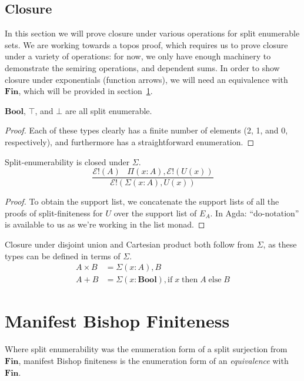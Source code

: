 \subsection{Closure}
In this section we will prove closure under various operations for split
enumerable sets.
We are working towards a topos proof, which requires us to prove closure under
a variety of operations: for now, we only have enough machinery to demonstrate
the semiring operations, and dependent sums.
In order to show closure under exponentials (function arrows), we will need an
equivalence with \(\mathbf{Fin}\), which will be provided in
section~\ref{manifest-bishop}.
\begin{rm-lemma} \label{split-enum-bool-top-bot}
  \(\mathbf{Bool}\), \(\top\), and \(\bot\) are all split enumerable.
\end{rm-lemma}
\begin{proof}
  Each of these types clearly has a finite number of elements (2, 1, and 0,
  respectively), and furthermore has a straightforward enumeration.
\end{proof}
\begin{rm-theorem} \label{split-enum-sigma}
  Split-enumerability is closed under \(\Sigma\).
  \begin{equation} \label{split-enum-sigma-clos-sig}
    \frac{
      \mathcal{E}!(A) \; \; \; \Pi (x : A) , \mathcal{E}!(U(x))
    }{
      \mathcal{E}!(\Sigma (x : A) , U(x))
    }
  \end{equation}
\end{rm-theorem}
\begin{proof}
  To obtain the support list, we concatenate the support lists of all the proofs
  of split-finiteness for \(U\) over the support list of \(E_A\).
  In Agda:
  ``do-notation'' is available to us as we're working in the list monad.
\end{proof}
Closure under disjoint union and Cartesian product both follow from \(\Sigma\),
as these types can be defined in terms of \(\Sigma\).
\begin{align}
  A \times B &= \Sigma {(x : A)} , B \\
  A + B &= \Sigma {(x : \mathbf{Bool})} , \text{if} \; x \; \text{then} \; A \; \text{else} \; B
\end{align}
\section{Manifest Bishop Finiteness} \label{manifest-bishop}
Where split enumerability was the enumeration form of a split surjection from
\(\mathbf{Fin}\), manifest Bishop finiteness is the enumeration form of an
\emph{equivalence} with \(\mathbf{Fin}\).

